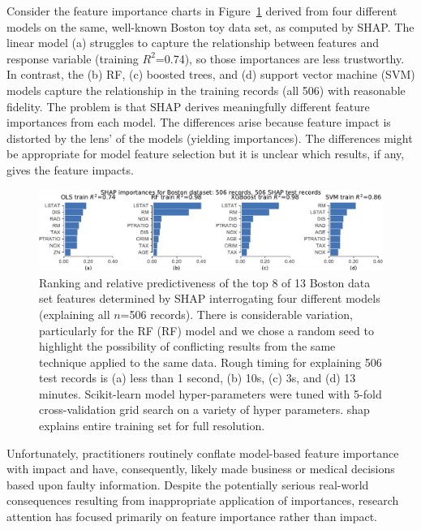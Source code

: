 \documentclass[11pt]{article}
\newcommand{\figref}[1]{Figure~\ref{#1}}
\begin{document}
Consider the feature importance charts in \figref{fig:diff-models} derived from four different models on the same, well-known Boston toy data set, as computed by SHAP. The linear model (a) struggles to capture the relationship between features and response variable (training $R^2$=0.74), so those importances are less trustworthy.  In contrast, the (b) RF, (c) boosted trees, and (d) support vector machine (SVM) models capture the relationship in the training records (all 506) with reasonable fidelity. The problem is that SHAP derives meaningfully different feature importances from each model. The differences arise because feature impact is distorted by the lens' of the models (yielding importances). The differences might be appropriate for model feature selection but it is unclear which results, if any, gives the feature impacts. 

\begin{figure}[htbp]
\begin{center}
\includegraphics[scale=0.6]{images/diff-models.pdf}
\vspace{-3mm}
\caption{\small Ranking and relative predictiveness of the top 8 of 13 Boston data set features determined by SHAP interrogating four different models (explaining all $n$=506 records).  There is considerable variation, particularly for the RF (RF) model and we chose a random seed to highlight the possibility of conflicting results from the same technique applied to the same data. Rough timing for explaining 506 test records is (a) less than 1 second, (b) 10s, (c) 3s, and (d) 13 minutes.  Scikit-learn model hyper-parameters were tuned with 5-fold cross-validation grid search on a variety of hyper parameters.  shap explains entire training set for full resolution.}
\label{fig:diff-models}
\end{center}
\end{figure}

Unfortunately, practitioners routinely conflate model-based feature importance with impact and have, consequently, likely made business or medical decisions based upon faulty information. Despite the potentially serious real-world consequences resulting from inappropriate application of importances, research attention has focused primarily on feature importance rather than impact. 
\end{document}
